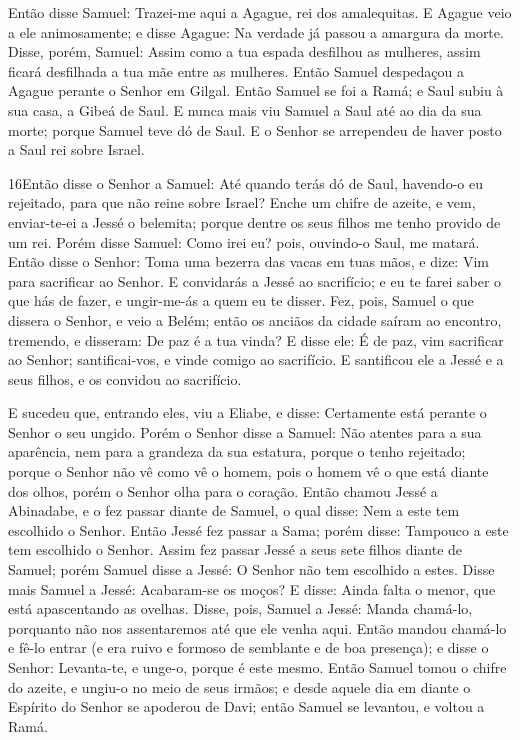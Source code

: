 Então disse Samuel: Trazei-me aqui a Agague, rei dos amalequitas.
E Agague veio a ele animosamente; e disse Agague: Na verdade já
passou a amargura da morte. Disse, porém, Samuel: Assim como
a tua espada desfilhou as mulheres, assim ficará desfilhada a tua
mãe entre as mulheres. Então Samuel despedaçou a Agague perante o
Senhor em Gilgal. Então Samuel se foi a Ramá; e Saul subiu à
sua casa, a Gibeá de Saul. E nunca mais viu Samuel a Saul até
ao dia da sua morte; porque Samuel teve dó de Saul. E o Senhor se
arrependeu de haver posto a Saul rei sobre Israel.

\medskip

\lettrine{16} Então disse o Senhor a Samuel: Até quando terás
dó de Saul, havendo-o eu rejeitado, para que não reine sobre Israel?
Enche um chifre de azeite, e vem, enviar-te-ei a Jessé o belemita;
porque dentre os seus filhos me tenho provido de um rei. Porém
disse Samuel: Como irei eu? pois, ouvindo-o Saul, me matará. Então
disse o Senhor: Toma uma bezerra das vacas em tuas mãos, e dize: Vim
para sacrificar ao Senhor. E convidarás a Jessé ao sacrifício; e
eu te farei saber o que hás de fazer, e ungir-me-ás a quem eu te
disser. Fez, pois, Samuel o que dissera o Senhor, e veio a
Belém; então os anciãos da cidade saíram ao encontro, tremendo, e
disseram: De paz é a tua vinda? E disse ele: É de paz, vim
sacrificar ao Senhor; santificai-vos, e vinde comigo ao sacrifício.
E santificou ele a Jessé e a seus filhos, e os convidou ao
sacrifício.

E sucedeu que, entrando eles, viu a Eliabe, e disse: Certamente
está perante o Senhor o seu ungido. Porém o Senhor disse a
Samuel: Não atentes para a sua aparência, nem para a grandeza da sua
estatura, porque o tenho rejeitado; porque o Senhor não vê como vê o
homem, pois o homem vê o que está diante dos olhos, porém o Senhor
olha para o coração. Então chamou Jessé a Abinadabe, e o fez
passar diante de Samuel, o qual disse: Nem a este tem escolhido o
Senhor. Então Jessé fez passar a Sama; porém disse: Tampouco a
este tem escolhido o Senhor. Assim fez passar Jessé a seus
sete filhos diante de Samuel; porém Samuel disse a Jessé: O Senhor
não tem escolhido a estes. Disse mais Samuel a Jessé:
Acabaram-se os moços? E disse: Ainda falta o menor, que está
apascentando as ovelhas. Disse, pois, Samuel a Jessé: Manda
chamá-lo, porquanto não nos assentaremos até que ele venha aqui.
Então mandou chamá-lo e fê-lo entrar (e era ruivo e formoso
de semblante e de boa presença); e disse o Senhor: Levanta-te, e
unge-o, porque é este mesmo. Então Samuel tomou o chifre do
azeite, e ungiu-o no meio de seus irmãos; e desde aquele dia em
diante o Espírito do Senhor se apoderou de Davi; então Samuel se
levantou, e voltou a Ramá.

